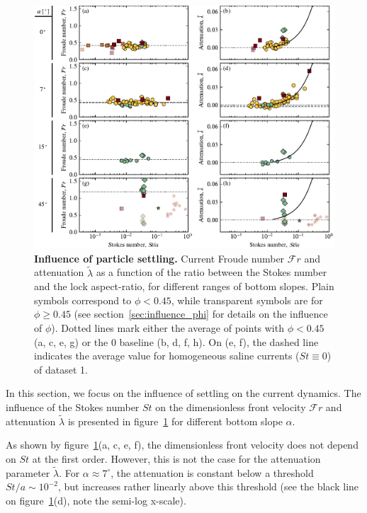 \documentclass[twocolumn]{article}
\begin{document}
\begin{figure}[ht]
	\centering
	\includegraphics{figure5.pdf}
	\caption{\textbf{Influence of particle settling.} Current Froude number $\mathcal{F}r$ and attenuation $\tilde{\lambda}$ as a function of the ratio between the Stokes number and the lock aspect-ratio, for different ranges of bottom slopes. Plain symbols correspond to $\phi < 0.45$, while transparent symbols are for $\phi \geq 0.45$ (see section~\ref{sec:influence_phi} for details on the influence of $\phi$). Dotted lines mark either the average of points with $\phi < 0.45$ (a, c, e, g) or the 0 baseline (b, d, f, h). On (e, f), the dashed line indicates the average value for homogeneous saline currents ($St \equiv 0$) of dataset 1.}
	\label{fig:fig5}
\end{figure}

In this section, we focus on the influence of settling on the current dynamics. The influence of the Stokes number $St$ on the dimensionless front velocity $\mathcal{F}r$ and attenuation $\tilde{\lambda}$ is presented in figure~\ref{fig:fig5} for different bottom slope $\alpha$.

As shown by figure~\ref{fig:fig5}(a, c, e, f), the dimensionless front velocity does not depend on $St$ at the first order. However, this is not the case for the attenuation parameter $\tilde{\lambda}$. For $\alpha \approx 7^\circ$, the attenuation is constant below a threshold $St/a \sim 10^{-2}$, but increases rather linearly above this threshold (see the black line on figure~\ref{fig:fig5}(d), note the semi-log x-scale).
\end{document}
